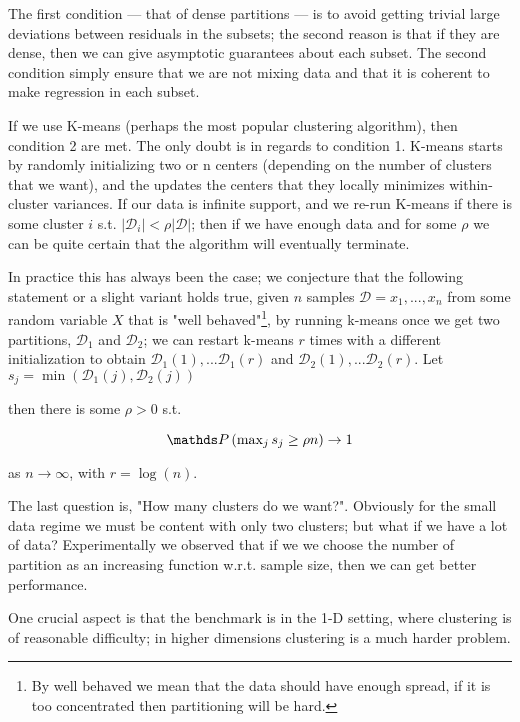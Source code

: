 The first condition ---  that of dense partitions ---  is to avoid getting trivial large deviations between residuals 
in the subsets; the second reason is that if they are dense, then we can give asymptotic guarantees about each subset.
The second condition simply ensure that we are not mixing data and that it is coherent to make regression
in each subset. 

If we use K-means (perhaps the most popular clustering algorithm), then condition 2 are met. The only 
doubt is in regards to condition 1. K-means starts by randomly initializing two or n centers (depending 
on the number of clusters that we want), and the updates the centers that they locally 
minimizes within-cluster variances. If our data is infinite support, and we re-run K-means if there is some cluster
$i$ s.t. $|\mathcal{D}_i| < \rho |\mathcal{D}|$; then if we have enough data and for some $\rho$ we can be quite 
certain that the algorithm will eventually terminate. 

In practice this has always been the case; we conjecture that the following statement or a slight variant holds true, 
given $n$ samples $ \mathcal{D} = x_1, ..., x_n$ from some random variable $X$ 
that is "well behaved"\footnote{By well behaved we mean that the data should have enough spread, if it is too
concentrated then partitioning will be hard.}, by running k-means once we get two partitions, 
$\mathcal{D}_1$ and $\mathcal{D}_2$; we can
restart k-means $r$  times with a different initialization to obtain $\mathcal{D}_1(1), ...\mathcal{D}_1(r)$ and 
$\mathcal{D}_2(1), ...\mathcal{D}_2(r)$. Let $s_j = \operatorname{min} \left(\mathcal{D}_1(j), \mathcal{D}_2(j)\right)$

then there is some $\rho > 0$ s.t.

$$
    \Prob \left( \operatorname{max}_j s_j \geq \rho n \right) \rightarrow 1
$$

as $n \rightarrow \infty$, with $r = \log(n)$. 

The last question is, "How many clusters do we want?". Obviously for the small data regime we must be content 
with only two clusters; but what if we have a lot of data? Experimentally we observed that if we 
we choose the number of partition as an increasing function w.r.t. sample size, then we can get better performance.

One crucial aspect is that the benchmark is in the 1-D setting, where clustering is of reasonable difficulty; 
in higher dimensions clustering is a much harder problem. 


